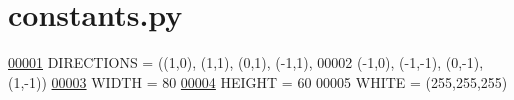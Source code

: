 \hypertarget{constants_8py_source}{\section{constants.\+py}
}

\begin{DoxyCode}
\hypertarget{constants_8py_source_l00001}{}\hyperlink{namespaceconstants_ac910045b50610ec197515a3635d8d037}{00001} DIRECTIONS = ((1,0), (1,1), (0,1), (-1,1),
00002     (-1,0), (-1,-1), (0,-1), (1,-1))
\hypertarget{constants_8py_source_l00003}{}\hyperlink{namespaceconstants_aa1f49ae50d4547cd3b9f4801d04f5830}{00003} WIDTH = 80
\hypertarget{constants_8py_source_l00004}{}\hyperlink{namespaceconstants_a581305cb095bf2d8826a12abef66a15e}{00004} HEIGHT = 60
00005 WHITE = (255,255,255)
\end{DoxyCode}
